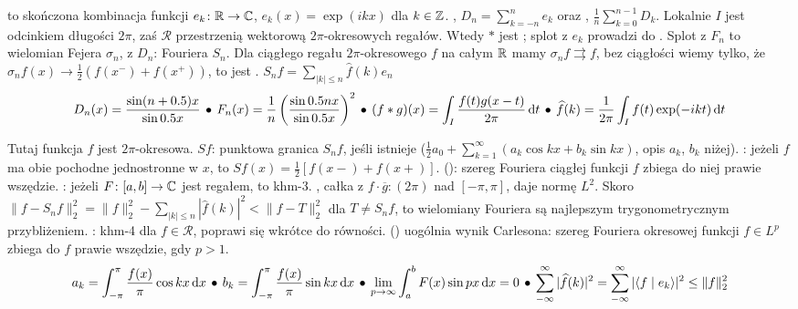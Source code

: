   to skończona kombinacja funkcji $e_k \colon \mathbb{R} \to \mathbb{C}$, $e_k(x) = \exp (ikx)$ dla $k \in \mathbb{Z}$.
, $D_n = \sum_{k=-n}^{n} e_k$ oraz , $\frac 1 n \sum_{k=0}^{n-1} D_k$.
Lokalnie $I$ jest odcinkiem długości $2\pi$, zaś $\mathcal R$ przestrzenią wektorową $2\pi$-okresowych regałów.
Wtedy $*$ jest ; splot z $e_k$ prowadzi do .
Splot z $F_n$ to wielomian Fejera $\sigma_n$, z $D_n$: Fouriera $S_n$.
Dla ciągłego regału $2\pi$-okresowego $f$ na całym $\mathbb{R}$ mamy $\sigma_n f \rightrightarrows f$, bez ciągłości wiemy tylko, że $\sigma_n f(x) \to \frac 1 2 (f(x^-) + f(x^+))$, to jest .
\hfill
{\color{Red}$S_n f = \sum_{|k| \le n} \widehat f(k) e_n$}
\[
	D_n(x) = \frac{\sin (n+ 0.5) x }{\sin 0.5 x} \, \bullet \,
	F_n(x) = \frac 1 n \left(\frac {\sin 0.5 n x }{\sin 0.5 x} \right)^2 \, \bullet \,
	{(f * g)(x) = \int_{I} \frac{f(t) g(x-t)}{2 \pi}\, \text{d}t} \, \bullet \,
	\widehat f(k) = \frac {1}{2\pi} \int_I f(t) \exp ( - i k t) \, \textrm{d}t
\]

Tutaj funkcja $f$ jest $2\pi$-okresowa.
  $Sf$: punktowa  granica $S_nf$, jeśli  istnieje ($\frac 12 a_0 + \sum_{k=1}^\infty (a_k \cos kx + b_k \sin kx)$, opis $a_k$, $b_k$ niżej).
: jeżeli $f$ ma obie pochodne jednostronne w $x$, to $Sf(x) = \frac 1 2 [f(x{-}) + f(x{+})]$.
 (): szereg Fouriera ciągłej funkcji $f$ zbiega do niej prawie wszędzie.
: jeżeli $F \colon [a,b] \to \mathbb{C}$ jest regałem, to khm-3.
, całka z $f \cdot \overline g : (2\pi)$ nad $[-\pi, \pi]$, daje normę $L^2$.
Skoro $\|f - S_nf\|_2^2 = \|f\|_2^2 - \sum_{|k| \le n} |\widehat f (k)|^2 < \|f - T\|_2^2$ dla $T \neq S_nf$, to wielomiany Fouriera są najlepszym trygonometrycznym przybliżeniem.
: khm-4 dla $f \in \mathcal R$, poprawi się wkrótce do równości.
 () uogólnia wynik Carlesona: szereg Fouriera okresowej funkcji $f \in L^p$ zbiega do $f$ prawie wszędzie, gdy $p > 1$.
\[
	a_k = \int_{-\pi}^\pi\frac{f(x)}{\pi} \cos kx  \,\textrm{d}x \, \bullet \,
	b_k = \int_{-\pi}^\pi \frac{f(x)}{\pi}\sin kx  \,\textrm{d}x \, \bullet \,
	\lim_{p \to \infty} \int_a^b F(x) \sin p x \, \textrm{d}x = 0 \, \bullet \,
	\sum_{-\infty}^\infty | \widehat{f}(k)|^2 = \sum_{-\infty}^\infty |\langle f \mid e_k \rangle|^2 \le \|f\|_2^2
\] 

